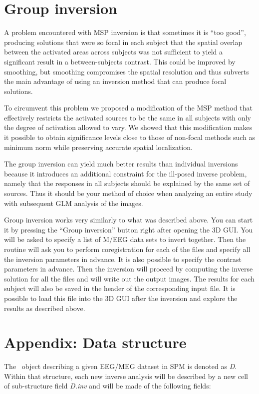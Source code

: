 \section{Group inversion}
A problem encountered with MSP inversion is that sometimes it is ``too good'', producing solutions that were so focal in each subject that the spatial overlap between the activated areas across subjects was not sufficient to yield a significant result in a between-subjects contrast. This could be improved by smoothing, but smoothing compromises the spatial resolution and thus subverts the main advantage of using an inversion method that can produce focal solutions.

To circumvent this problem we proposed a modification of the MSP method \cite{vl_group} that effectively restricts the activated sources to be the same in all subjects with only the degree of activation allowed to vary. We showed that this modification makes it possible to obtain significance levels close to those of non-focal methods such as minimum norm while preserving accurate spatial localization.

The group inversion can yield much better results than individual inversions because it introduces an additional constraint for the ill-posed inverse problem, namely that the responses in all subjects should be explained by the same set of sources. Thus it should be your method of choice when analyzing an entire study with subsequent GLM analysis of the images.

Group inversion works very similarly to what was described above. You can start it by pressing the ``Group inversion'' button right after opening the 3D GUI. You will be asked to specify a list of M/EEG data sets to invert together. Then the routine will ask you to perform coregistration for each of the files and specify all the inversion parameters in advance. It is also possible to specify the contrast parameters in advance. Then the inversion will proceed by computing the inverse solution for all the files and will write out the output images. The results for each subject will also be saved in the header of the corresponding input file. It is possible to load this file into the 3D GUI after the inversion and explore the results as described above.

\section{Appendix: Data structure}
The \matlab\ object describing a given EEG/MEG dataset in SPM is denoted as \textit{D}.
Within that structure, each new inverse analysis will be described by a new cell of sub-structure
field \textit{D.inv} and will be made of the following fields:


